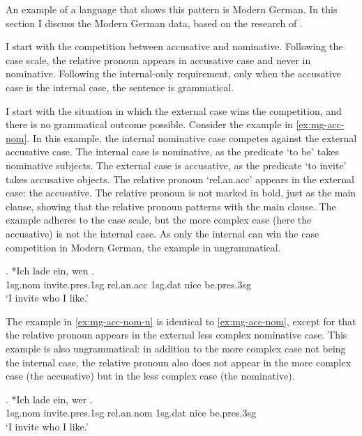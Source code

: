 An example of a language that shows this pattern is Modern German. In this section I discuss the Modern German data, based on the research of \citet{vogel2001}.

I start with the competition between accusative and nominative. Following the case scale, the relative pronoun appears in accusative case and never in nominative. Following the internal-only requirement, only when the accusative case is the internal case, the sentence is grammatical.

I start with the situation in which the external case wins the competition, and there is no grammatical outcome possible.
Consider the example in \ref{ex:mg-acc-nom}. In this example, the internal nominative case competes against the external accusative case.
The internal case is nominative, as the predicate  `to be' takes nominative subjects.
The external case is accusative, as the predicate  `to invite' takes accusative objects.
The relative pronoun  `\ac{rel}.\ac{an}.\ac{acc}' appears in the external case: the accusative. The relative pronoun is not marked in bold, just as the main clause, showing that the relative pronoun patterns with the main clause.
The example adheres to the case scale, but the more complex case (here the accusative) is not the internal case. As only the internal can win the case competition in Modern German, the example in ungrammatical.

\exg. *Ich {lade ein}, wen   .\\
 1\ac{sg}.\ac{nom} invite.\ac{pres}.1\ac{sg}\scsub{[acc]} \ac{rel}.\ac{an}.\ac{acc} 1\ac{sg}.\ac{dat} nice be.\ac{pres}.3\ac{sg}\scsub{[nom]}\\
 `I invite who I like.' \label{ex:mg-acc-nom}

The example in \ref{ex:mg-acc-nom-u} is identical to \ref{ex:mg-acc-nom}, except for that the relative pronoun appears in the external less complex nominative case. This example is also ungrammatical: in addition to the more complex case not being the internal case, the relative pronoun also does not appear in the more complex case (the accusative) but in the less complex case (the nominative).

\exg. *Ich {lade ein}, wer   .\\
 1\ac{sg}.\ac{nom} invite.\ac{pres}.1\ac{sg}\scsub{[acc]} \ac{rel}.\ac{an}.\ac{nom} 1\ac{sg}.\ac{dat} nice be.\ac{pres}.3\ac{sg}\scsub{[nom]}\\
 `I invite who I like.' \label{ex:mg-acc-nom-u}

